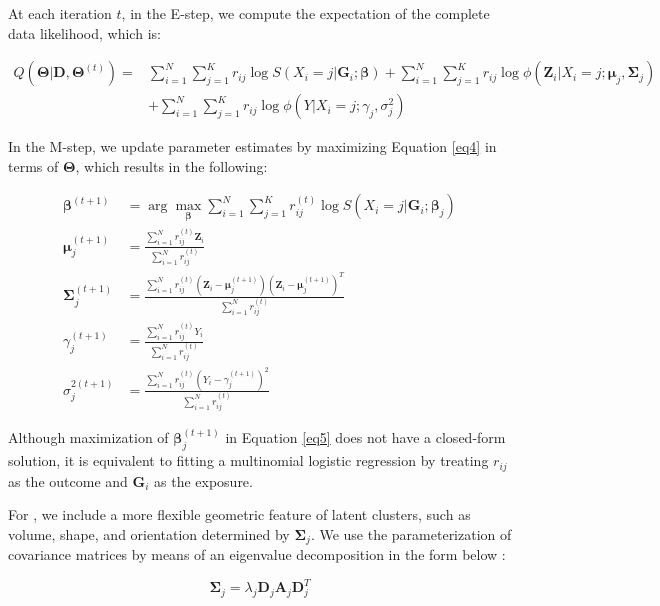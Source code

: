 At each iteration $t$, in the E-step, we compute the expectation of the complete data likelihood, which is:

\begin{equation}
    \begin{aligned}
        Q(\bm{\Theta}|\bm{D}, \bm{\Theta}^{(t)}) = & \sum_{i=1}^N\sum_{j=1}^K r_{ij} \log S\left(X_i = j|\bm{G}_i;\bm{\beta}\right) + \sum_{i=1}^N\sum_{j=1}^K r_{ij} \log \phi(\bm{Z}_i|X_i = j;\bm{\mu}_j, \bm{\Sigma}_j) \\
        & + \sum_{i=1}^N\sum_{j=1}^K r_{ij} \log \phi\left(Y|X_i = j; \gamma_j, \sigma_j^2\right)
    \end{aligned}
    \label{eq4}
\end{equation}

In the M-step, we update parameter estimates by maximizing Equation \ref{eq4} in terms of $\bm \Theta$, which results in the following:

\begin{align}
    \bm \beta^{(t+1)} & = \arg \max_{\bm \beta} \sum_{i=1}^N \sum_{j=1}^K r_{ij}^{(t)} \log S(X_i = j| \bm G_i; \bm \beta_j) \label{eq5} \\
    \bm \mu_j^{(t+1)} & = \frac{\sum_{i=1}^N r_{ij}^{(t)}\bm Z_i}{\sum_{i=1}^N r_{ij}^{(t)}} \label{eq6} \\
    \bm \Sigma_j^{(t+1)} & = \frac{\sum_{i=1}^N r_{ij}^{(t)} \left(\bm{Z}_i - \bm{\mu}_j^{(t+1)} \right) \left(\bm{Z}_i - \bm{\mu}_j^{(t+1)} \right)^T}{\sum_{i=1}^N r_{ij}^{(t)}} \label{eq7} \\
    \gamma_j^{(t+1)} & = \frac{\sum_{i=1}^N r_{ij}^{(t)}Y_i}{\sum_{i=1}^N r_{ij}^{(t)}} \label{eq8} \\
    \sigma_j^{2(t+1)} & = \frac{\sum_{i=1}^N r_{ij}^{(t)} \left(Y_i - \gamma_j^{(t+1)} \right)^2}{\sum_{i=1}^N r_{ij}^{(t)}} \label{eq9}
\end{align}

Although maximization of $\bm \beta_j^{(t+1)}$ in Equation \ref{eq5} does not have a closed-form solution, it is equivalent to fitting a multinomial logistic regression by treating $r_{ij}$ as the outcome and $\bm G_i$ as the exposure.

For , we include a more flexible geometric feature of latent clusters, such as volume, shape, and orientation determined by $\bm \Sigma_j$. We use the parameterization of covariance matrices by means of an eigenvalue decomposition in the form below \citep{banfield1993model}:

\begin{equation}
    \boldsymbol{\Sigma}_j = \lambda_j \boldsymbol{D}_j  \boldsymbol{A}_j \boldsymbol{D}_j^T \label{eq10}
\end{equation}

